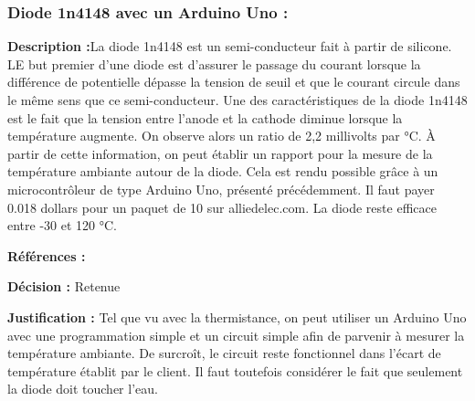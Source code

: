 \subsubsection{Diode 1n4148 avec un Arduino Uno : }
\label{1n4}

\textbf{ Description :}La diode 1n4148 est un semi-conducteur fait à partir de silicone. LE but premier d’une diode est d’assurer le passage du courant lorsque la différence de potentielle dépasse la tension de seuil et que le courant circule dans le même sens que ce semi-conducteur. Une des caractéristiques de la diode 1n4148 est le fait que la tension entre l’anode et la cathode diminue lorsque la température augmente. On observe alors un ratio de 2,2 millivolts par °C. À partir de cette information, on peut établir un rapport pour la mesure de la température ambiante autour de la diode. Cela est rendu possible grâce à un microcontrôleur de type Arduino Uno, présenté précédemment. Il faut payer 0.018 dollars pour un paquet de 10 sur alliedelec.com. La diode reste efficace entre -30 et 120 °C.

\textbf{Références :} \cite{Allie} \cite{Tu1n}  \cite{Da1n}

\textbf{Décision :} Retenue

\textbf{Justification :} Tel que vu avec la thermistance, on peut utiliser un Arduino Uno avec une programmation simple et un circuit simple afin de parvenir à mesurer la température ambiante. De surcroît, le circuit reste fonctionnel dans l’écart de température établit par le client. Il faut toutefois considérer le fait que seulement la diode doit toucher l'eau.

\begin{table}[!htb]
\footnotesize
\centering
{}
\caption{Évaluation globales des concepts pour la mesure de la température externe}
\label{t:Decision_thermo_ext}
\end{table}


